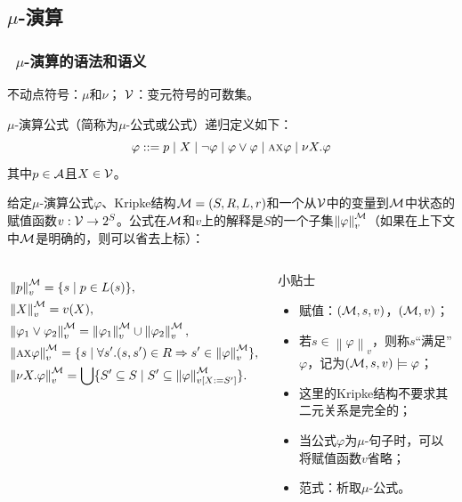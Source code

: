\documentclass[9pt, CJK]{beamer}
\begin{document}
	\subsection{$\mu$-演算}
	\begin{frame} 
		\frametitle{~$\mu$-演算的语法和语义}
		{\footnotesize 
			不动点符号：$\mu$和$\nu$；\qquad
			${\cal V}$：变元符号的可数集。
			
			\begin{definition}[$\mu$-演算公式]
				$\mu$-演算公式（简称为$\mu$-公式或公式）递归定义如下：
				\[
				\varphi ::=   p\mid  X\mid \neg \varphi\mid \varphi \vee \varphi \mid \textsc{a}\textsc{x} \varphi\mid  \nu X. \varphi
				\]
				其中$p\in {\cal A}$且$X\in {\cal V}$。
			\end{definition}
			\begin{definition}
				给定$\mu$-演算公式$\varphi$、Kripke结构{\em ${\cal M}=(S,R,L,r)$}和一个从${\cal V}$中的变量到${\cal M}$中状态的赋值函数$v: {\cal V} \rightarrow 2^S$。公式在${\cal M}$和$v$上的解释是$S$的一个子集$\left\| \varphi\right\|_v^{{\cal M}}$（如果在上下文中${\cal M}$是明确的，则可以省去上标）：
				\begin{columns}
					\begin{align*}
						& \left \| p\right \|_v^{{\cal M}} = \{s\mid p \in L(s)\}, \\  
						& \left\| X\right\|_v^{{\cal M}} = v(X),\\
						& \left\|\varphi_1 \vee \varphi_2\right\|_v^{{\cal M}} = \left\|\varphi_1\right\|_v^{{\cal M}} \cup \left\|\varphi_2\right\|_v^{{\cal M}},\\ 
						& \left\|\textsc{a} \textsc{x} \varphi\right\|_v^{{\cal M}} = \{s\mid \forall s'. (s, s') \in R \Rightarrow s' \in \left\|\varphi\right\|_v^{{\cal M}}\},\\ 
						& \left\| \nu X. \varphi\right\|_v^{{\cal M}} = \bigcup\{S' \subseteq S \mid S' \subseteq \left\|\varphi\right\|_{v[X:= S']}^{{\cal M}}\}.
					\end{align*}
					{\tiny 
						\begin{block}{{\scriptsize 小贴士}}
							\begin{itemize} 
								\item 赋值：$({\cal M},s,v)$，$({\cal M},v)$；
								\item 若$s\in \left\| \varphi \right\|_v$，则称$s$“满足”$\varphi$，记为$({\cal M}, s, v) \models \varphi$；
								\item 这里的Kripke结构不要求其二元关系是完全的；
								\item 当公式$\varphi$为$\mu$-句子时，可以将赋值函数$v$省略；
								\item 范式：析取$\mu$-公式。
							\end{itemize}
						\end{block}
					} 
				\end{columns}
				

\end{definition}}
\end{frame}
\end{document}
